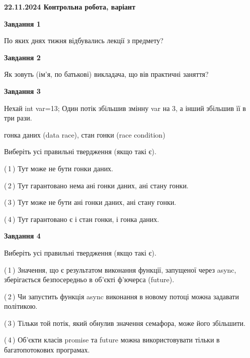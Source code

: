 \documentclass[12pt, ukrainian]{article}
\begin{document}
\begin {large}

\textbf{22.11.2024 Контрольна робота, варіант  }\par


{

\begin{center}
\textbf{Завдання 1}
\end{center}

По яких днях тижня відбувались лекції з предмету?


\begin{center}
\textbf{Завдання 2}
\end{center}

Як зовуть (ім'я, по батькові) викладача, що вів практичні заняття?


\begin{center}
\textbf{Завдання 3}
\end{center}

Нехай int var=13; Один потік збільшив змінну var на 3, а інший збільшив її в три рази.

гонка даних (data race), стан гонки (race condition)

Виберіть усі правильні твердження (якщо такі є).\par
\vspace{2mm}
(\,1\,) Тут може не бути гонки даних.%

(\,2\,) Тут гарантовано нема ані гонки даних, ані стану гонки.%

(\,3\,) Тут може не бути ані гонки даних, ані стану гонки.%

(\,4\,) Тут гарантовано є і стан гонки, і гонка даних.%


\begin{center}
\textbf{Завдання 4}
\end{center}

Виберіть усі правильні твердження (якщо такі є).\par
\vspace{2mm}

(\,1\,) Значення, що є результатом виконання функції, запущеної через async, зберігається безпосередньо в об’єкті ф’ючерса (future).%

(\,2\,) Чи запустить функція  async виконання в новому потоці можна задавати політикою.%

(\,3\,) Тільки той потік, який обнулив значення семафора, може його збільшити.%

(\,4\,) Об’єкти класів promise та future можна використовувати тільки в багатопотокових програмах.%


}
\end{large}
\end{document}
